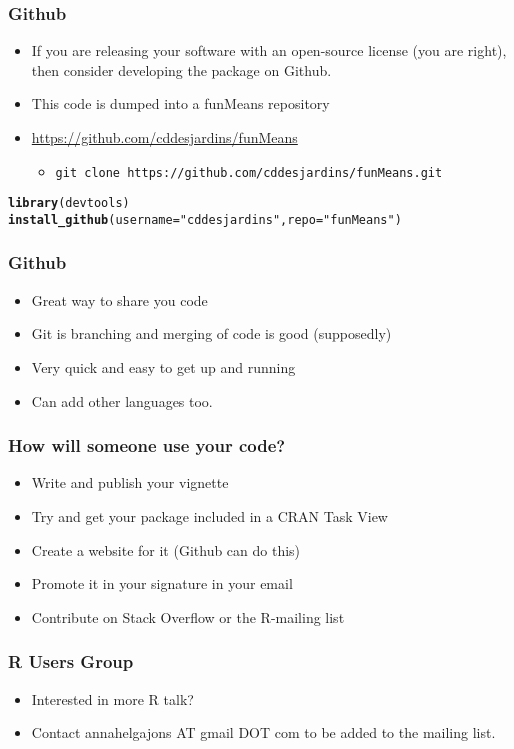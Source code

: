 \documentclass[xcolor=svgnames]{beamer}\usepackage[]{graphicx}\usepackage[]{color}
\makeatletter
\newcommand{\hlstr}[1]{\textcolor[rgb]{0.192,0.494,0.8}{#1}}%
\newcommand{\hlstd}[1]{\textcolor[rgb]{0.345,0.345,0.345}{#1}}%
\newcommand{\hlkwc}[1]{\textcolor[rgb]{0.333,0.667,0.333}{#1}}%
\newcommand{\hlkwd}[1]{\textcolor[rgb]{0.737,0.353,0.396}{\textbf{#1}}}%
\newenvironment{kframe}{%
 \def\at@end@of@kframe{}%
 \ifinner\ifhmode%
  \def\at@end@of@kframe{\end{minipage}}%
  \begin{minipage}{\columnwidth}%
 \fi\fi%
 \def\FrameCommand##1{\hskip\@totalleftmargin \hskip-\fboxsep
 \colorbox{shadecolor}{##1}\hskip-\fboxsep
     \hskip-\linewidth \hskip-\@totalleftmargin \hskip\columnwidth}%
 \MakeFramed {\advance\hsize-\width
   \@totalleftmargin\z@ \linewidth\hsize
   \@setminipage}}%
 {\par\unskip\endMakeFramed%
 \at@end@of@kframe}
\newenvironment{knitrout}{}{} %
\makeatother
\begin{document}
\begin{frame}[fragile]
  \frametitle{Github}
  \begin{itemize}
  \item If you are releasing your software with an open-source license (you are right), then consider developing the package on Github.
    \item This code is dumped into a funMeans repository
      \item \url{https://github.com/cddesjardins/funMeans}
        \begin{itemize}
        \item \texttt{git clone https://github.com/cddesjardins/funMeans.git}
        \end{itemize}
  \end{itemize}    
 
\begin{knitrout}
\color{fgcolor}\begin{kframe}
\begin{alltt}
\hlkwd{library}\hlstd{(devtools)}
\hlkwd{install_github}\hlstd{(}\hlkwc{username}\hlstd{=}\hlstr{"cddesjardins"}\hlstd{,}\hlkwc{repo}\hlstd{=}\hlstr{"funMeans"}\hlstd{)}
\end{alltt}
\end{kframe}
\end{knitrout}
\end{frame}

\begin{frame}
  \frametitle{Github}
  \begin{itemize}
    \item Great way to share you code
    \item Git is branching and merging of code is good (supposedly)
      \item Very quick and easy to get up and running
      \item Can add other languages too.
    \end{itemize}
\end{frame}

\begin{frame}
  \frametitle{How will someone use your code?}
  \begin{itemize}
  \item Write and publish your vignette
  \item Try and get your package included in a CRAN Task View
  \item Create a website for it (Github can do this)
  \item Promote it in your signature in your email
  \item Contribute on Stack Overflow or the R-mailing list 
  \end{itemize}

  \end{frame}

\begin{frame}
\frametitle{R Users Group}
\begin{itemize}
\item Interested in more R talk?
\item Contact annahelgajons AT gmail DOT com to be added to the mailing list. 
\end{itemize}
\end{frame}
  
\end{document}
